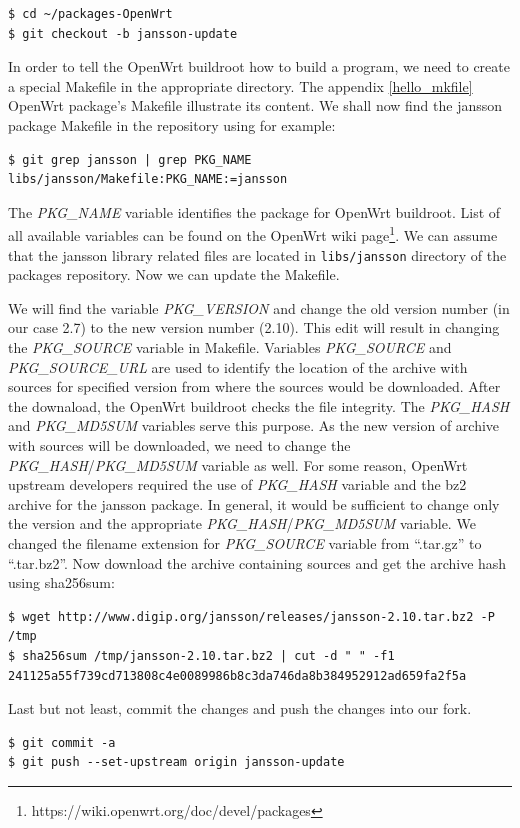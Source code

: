 \begin{lstlisting}[columns=fixed,basicstyle=\ttfamily\footnotesize,tabsize=4,backgroundcolor=\color{yellow!10}]
$ cd ~/packages-OpenWrt
$ git checkout -b jansson-update
\end{lstlisting}
In order to tell the OpenWrt buildroot how to build a program, we need to create a special Makefile in the appropriate directory.
The appendix \ref{hello_mkfile} OpenWrt package's Makefile illustrate its content.
We shall now find the jansson package Makefile in the repository using for example:
\begin{lstlisting}[columns=fixed,basicstyle=\ttfamily\footnotesize,tabsize=4,backgroundcolor=\color{yellow!10}]
$ git grep jansson | grep PKG_NAME
libs/jansson/Makefile:PKG_NAME:=jansson
\end{lstlisting}
The {\it PKG\_NAME} variable identifies the package for OpenWrt buildroot\cite{creating_pkgs}.
List of all available variables can be found on the OpenWrt wiki page\footnote{https://wiki.openwrt.org/doc/devel/packages}.
We can assume that the jansson library related files are located in {\tt libs/jansson} directory of the packages repository.
Now we can update the Makefile.

We will find the variable {\it PKG\_VERSION} and change the old version number (in our case 2.7) to the new version number (2.10).
This edit will result in changing the {\it PKG\_SOURCE} variable in Makefile.
Variables {\it PKG\_SOURCE} and {\it PKG\_SOURCE\_URL} are used to identify the location of the archive with sources for specified version from where the sources would be downloaded.
After the downaload, the OpenWrt buildroot checks the file integrity.
The {\it PKG\_HASH} and {\it PKG\_MD5SUM} variables serve this purpose.
As the new version of archive with sources will be downloaded, we need to change the {\it PKG\_HASH}/{\it PKG\_MD5SUM} variable as well.
For some reason, OpenWrt upstream developers required the use of {\it PKG\_HASH} variable and the bz2 archive for the jansson package.
In general, it would be sufficient to change only the version and the appropriate {\it PKG\_HASH}/{\it PKG\_MD5SUM} variable.
We changed the filename extension for {\it PKG\_SOURCE} variable from “.tar.gz” to “.tar.bz2”.
Now download the archive containing sources and get the archive hash using sha256sum:
\begin{lstlisting}[columns=fixed,basicstyle=\ttfamily\footnotesize,tabsize=4,backgroundcolor=\color{yellow!10}]
$ wget http://www.digip.org/jansson/releases/jansson-2.10.tar.bz2 -P /tmp
$ sha256sum /tmp/jansson-2.10.tar.bz2 | cut -d " " -f1
241125a55f739cd713808c4e0089986b8c3da746da8b384952912ad659fa2f5a
\end{lstlisting}
Last but not least, commit the changes and push the changes into our fork.
\begin{lstlisting}[columns=fixed,basicstyle=\ttfamily\footnotesize,tabsize=4,backgroundcolor=\color{yellow!10}]
$ git commit -a
$ git push --set-upstream origin jansson-update
\end{lstlisting}

